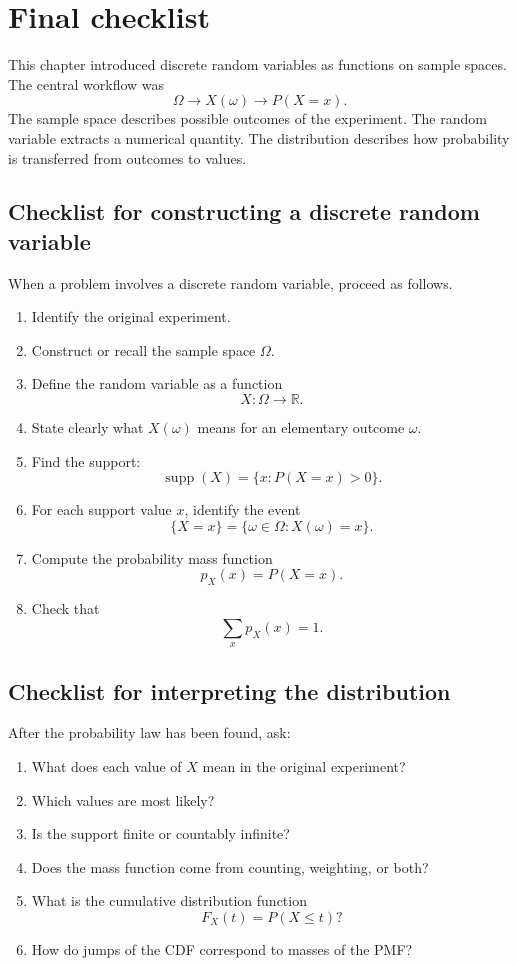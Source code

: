 \section{Final checklist}

This chapter introduced discrete random variables as functions on sample spaces.
The central workflow was
\[
\Omega\longrightarrow X(\omega)\longrightarrow P(X=x).
\]
The sample space describes possible outcomes of the experiment. The random
variable extracts a numerical quantity. The distribution describes how
probability is transferred from outcomes to values.

\subsection*{Checklist for constructing a discrete random variable}

When a problem involves a discrete random variable, proceed as follows.

\begin{enumerate}
    \item Identify the original experiment.
    \item Construct or recall the sample space \(\Omega\).
    \item Define the random variable as a function
    \[
    X:\Omega\to\mathbb{R}.
    \]
    \item State clearly what \(X(\omega)\) means for an elementary outcome
    \(\omega\).
    \item Find the support:
    \[
    \operatorname{supp}(X)=\{x:P(X=x)>0\}.
    \]
    \item For each support value \(x\), identify the event
    \[
    \{X=x\}=\{\omega\in\Omega:X(\omega)=x\}.
    \]
    \item Compute the probability mass function
    \[
    p_X(x)=P(X=x).
    \]
    \item Check that
    \[
    \sum_x p_X(x)=1.
    \]
\end{enumerate}

\subsection*{Checklist for interpreting the distribution}

After the probability law has been found, ask:

\begin{enumerate}
    \item What does each value of \(X\) mean in the original experiment?
    \item Which values are most likely?
    \item Is the support finite or countably infinite?
    \item Does the mass function come from counting, weighting, or both?
    \item What is the cumulative distribution function
    \[
    F_X(t)=P(X\leq t)?
    \]
    \item How do jumps of the CDF correspond to masses of the PMF?
\end{enumerate}

